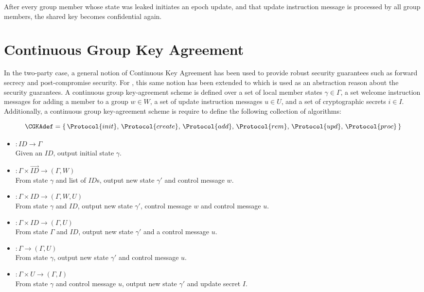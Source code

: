 \begin{definition}
After every group member whose state was leaked initiates an epoch update, and that update instruction message is processed by all group members, the shared key becomes confidential again.
\end{definition}


\hypertarget{sec:CGKA}{%
\section{Continuous Group Key Agreement}\label{sec:CGKA}}

In the two-party case, a general notion of Continuous Key Agreement \autocite{alwen2019double} has been used to provide robust security guarantees such as forward secrecy and post-compromise security.
For , this same notion has been extended to  \autocite{alwen2020security} which is used as an abstraction reason about the  security guarantees.
A continuous group key-agreement scheme is defined over a set of local member states $\gamma \in \Gamma$, a set welcome instruction messages for adding a member to a group $w \in W$, a set of update instruction messages $u \in U$, and a set of cryptographic secrets $i \in I$.
Additionally, a continuous group key-agreement scheme is require to define the following collection of algorithms:

\[ \CGKAdef = \left\{\,\Protocol{init},\, \Protocol{create},\, \Protocol{add},\, \Protocol{rem},\, \Protocol{upd},\, \Protocol{proc}\,\right\} \]

\begin{itemize}
\item {}   \(: ID \to \Gamma\)\\
  Given an \(ID\), output initial state \(\gamma\).
\item {} \(: \Gamma \times \overrightarrow{ID} \to (\Gamma, W)\)\\
  From state \(\gamma\) and list of \(ID\)s, output new state \(\gamma'\) and control message \(w\).
\item {}    \(: \Gamma \times ID \to (\Gamma, W, U)\)\\
  From state \(\gamma\) and \(ID\), output new state \(\gamma'\), control message \(w\) and control message \(u\).
\item {}    \(: \Gamma \times ID \to (\Gamma, U)\)\\
  From state \(\Gamma\) and \(ID\), output new state \(\gamma'\) and a control message \(u\).
\item {}    \(: \Gamma \to (\Gamma, U)\)\\
  From state \(\gamma\), output new state \(\gamma'\) and control message \(u\).
\item {}   \(: \Gamma \times U \to (\Gamma, I)\)\\
  From state \(\gamma\) and control message \(u\), output new state \(\gamma'\) and update secret \(I\).
\end{itemize}

